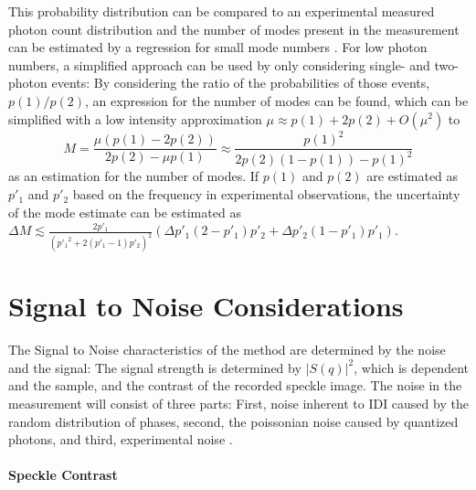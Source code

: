 This probability distribution can be compared to an experimental measured photon count distribution and the number of modes present in the measurement can be estimated by a regression for small mode numbers \cite{lehmkuhler2014,yun2019}. 
For low photon numbers, a simplified approach can be used by only considering single- and two-photon events: By considering the ratio of the probabilities of those events, $p(1) / p(2)$,  an expression for the number of modes can be found, which can be simplified with a low intensity approximation $\mu\approx p(1)+2p(2)+O(\mu^2)$ to 
\begin{equation}
	M=\frac{\mu  (p(1)-2 p(2))}{2 p(2)-\mu  p(1)}\approx \frac{p(1)^2}{2 p(2) (1-p(1))-p(1)^2}
	\label{eq:modesp1p2}
\end{equation}
as an estimation for the number of modes.
If $p(1)$ and $p(2)$ are estimated as $p'_1$ and $p'_2$ based on the frequency in experimental observations, the uncertainty of the mode estimate can be estimated as 
$\Delta M \lesssim \frac{2 p'_1}{\left({p'_1}^2+2 (p'_1-1) p'_2\right)^2} \left(\Delta p'_1 (2-p'_1) p'_2+\Delta p'_2 (1-p'_1) p'_1\right)$.


\section{Signal to Noise Considerations}
\label{sec:specklecontrast}
The Signal to Noise characteristics of the method are determined by the noise and the signal:
The signal strength is determined by $\left|S(q)\right|^2$, which is dependent and the sample, and the contrast of the recorded speckle image. The noise in the measurement will consist of three parts: First, noise inherent to IDI caused by the random distribution of phases, second, the poissonian noise caused by quantized photons, and third, experimental noise \cite{trost2020, goodman2007}. 

\paragraph{Speckle Contrast}

